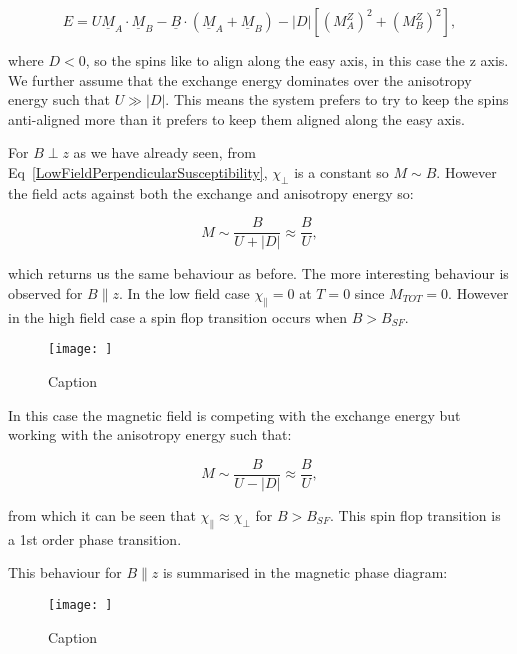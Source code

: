 \begin{equation}
    E = U \underline{M}_A \cdot \underline{M}_B - \underline{B} \cdot (\underline{M}_A + \underline{M}_B) - |D|[(M_A^Z)^2 + (M_B^Z)^2],
    \label{TwoSpinAntiferromagnetAnisotropyEnergy}
\end{equation}

\noindent where $D < 0$, so the spins like to align along the easy axis, in this case the z axis. We further assume that the exchange energy dominates over the anisotropy energy such that $U \gg |D|$. This means the system prefers to try to keep the spins anti-aligned more than it prefers to keep them aligned along the easy axis.

\noindent For $B \perp z$ as we have already seen, from Eq~\ref{LowFieldPerpendicularSusceptibility}, $\chi_\perp$ is a constant so $M \sim B$. However the field acts against both the exchange and anisotropy energy so:

\begin{equation}
    M \sim \frac{B}{U + |D|} \approx \frac{B}{U},
    \label{HighFieldPerpendicularSusceptibility}
\end{equation}

\noindent which returns us the same behaviour as before. The more interesting behaviour is observed for $B \parallel z$. In the low field case $\chi_\parallel = 0$ at $T = 0$ since $M_{TOT} = 0$. However in the high field case a spin flop transition occurs when $B > B_{SF}$.

\begin{figure}
    \centering
    \texttt{[image: ]}
    \caption{Caption}
    \label{fig:enter-label}
\end{figure}

\noindent In this case the magnetic field is competing with the exchange energy but working with the anisotropy energy such that:

\begin{equation}
    M \sim \frac{B}{U - |D|} \approx \frac{B}{U},
    \label{HighFieldParallelSusceptibility}
\end{equation}

\noindent from which it can be seen that $\chi_\parallel \approx \chi_\perp$ for $B > B_{SF}$. This spin flop transition is a 1st order phase transition.

\noindent This behaviour for $B \parallel z$ is summarised in the magnetic phase diagram:

\begin{figure}
    \centering
    \texttt{[image: ]}
    \caption{Caption}
    \label{fig:enter-label}
\end{figure}

